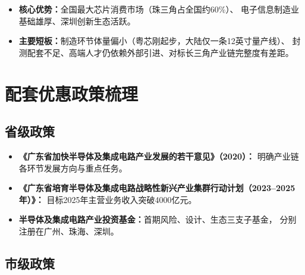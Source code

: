 \documentclass[12pt,a4paper]{ctexart}
\begin{document}
\begin{itemize}
    \item \textbf{核心优势：}全国最大芯片消费市场（珠三角占全国约60\%）、
          电子信息制造业基础雄厚、深圳创新生态活跃。
    \item \textbf{主要短板：}制造环节体量偏小（粤芯刚起步，大陆仅一条12英寸量产线）、
          封测配套不足、高端人才仍依赖外部引进、对标长三角产业链完整度有差距。
\end{itemize}

\section{配套优惠政策梳理}
\label{sec:policy}

\subsection{省级政策}
\label{sec:provincial_policy}

\begin{itemize}
    \item \textbf{《广东省加快半导体及集成电路产业发展的若干意见》（2020）：}
          明确产业链各环节发展方向与重点任务。
    \item \textbf{《广东省培育半导体及集成电路战略性新兴产业集群行动计划（2023--2025年）》：}
          目标2025年主营业务收入突破4000亿元。
    \item \textbf{半导体及集成电路产业投资基金：}首期风险、设计、生态三支子基金，
          分别注册在广州、珠海、深圳。
\end{itemize}

\subsection{市级政策}
\label{sec:municipal_policy}
\end{document}
